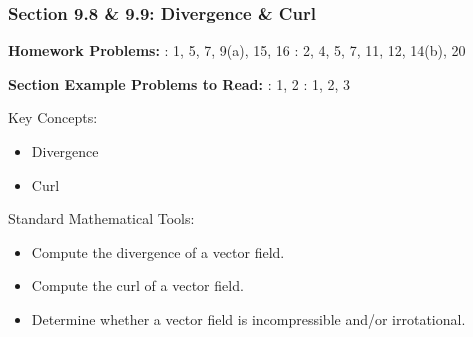 %
% 

\begin{frame}
\frametitle{\Large {\color[rgb]{0.02,0.20,1.0} Section 9.8 \& 9.9: Divergence \& Curl}}
\scriptsize

\vspace{0.2cm}
{\bf Homework Problems:} : 1, 5, 7, 9(a), 15, 16 : 2, 4, 5, 7, 11, 12, 14(b), 20

\vspace{0.2cm}

{\bf Section Example Problems to Read:} : 1, 2 : 1, 2, 3

\vspace{1.2cm}

\begin{block}{Key Concepts:}
\begin{itemize}
	\item[...] Divergence
	\item[...] Curl
\end{itemize}
\end{block}

\begin{block}{Standard Mathematical Tools:}
\begin{itemize}
	\item[...] Compute the divergence of a vector field.
	\item[...] Compute the curl of a vector field.
	\item[...] Determine whether a vector field is incompressible and/or irrotational.
\end{itemize}
\end{block}

\end{frame}

